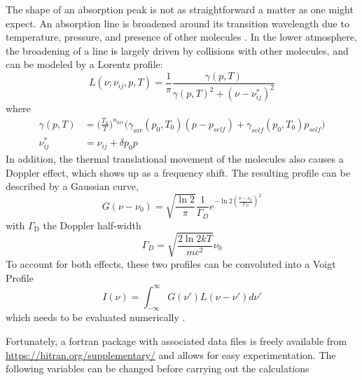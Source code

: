 \documentclass[10pt,a4paper,titlepage]{article}
\begin{document}
The shape of an absorption peak is not as straightforward a matter as
one might expect. An absorption line is broadened around its
transition wavelength due to temperature, pressure, and presence of
other molecules \citep{tennyson-al14:IUPAC}. In the lower atmosphere,
the broadening of a line is largely driven by collisions with other
molecules, and can be modeled by a Lorentz profile:
\begin{equation}
L(\nu; \nu_{ij}, p, T) = \frac{1}{\pi} \frac{\gamma(p, T)}{\gamma(p, T)^2 + (\nu - \nu^*_{ij})^2}
\end{equation}
where
\begin{equation}
\begin{split}
\gamma(p, T) & = \Bigg( \frac{T_0}{T} \Bigg)^{n_{air}} \bigg( \gamma_{air}(p_0, T_0)(p - p_{self}) + \gamma_{self}(p_0, T_0) p_{self} \bigg) \\
\nu_{ij}^* & = \nu_{ij} + \delta p_0 p
\end{split}
\end{equation}
In addition, the thermal translational movement of the molecules also
causes a Doppler effect, which shows up as a frequency shift. The
resulting profile can be described by a Gaussian curve, 
\begin{equation}
G(\nu - \nu_0) = \sqrt{\frac{\ln 2}{\pi}} \frac{1}{\Gamma_D} e^{-\ln 2 (\frac{\nu - \nu_0}{\Gamma_D})^2}
\end{equation}
with $\Gamma$$_{\text{D}}$ the Doppler half-width
\begin{equation}
\Gamma_D = \sqrt{\frac{2 \ln 2 k T}{m c^2}} \nu_0
\end{equation}
To account for both effects, these two profiles can be convoluted into
a Voigt Profile
\begin{equation}
I(\nu) = \int^{\infty}_{-\infty} G(\nu') L(\nu - \nu') d\nu'
\end{equation}
which needs to be evaluated numerically \citep{thompson93:voigt}.

Fortunately, a fortran package with associated data files
\citep{gordon-al22:hitran2020,lamouroux-al15:linemixing} is freely
available from \url{https://hitran.org/supplementary/} and allows for easy
experimentation.  The following variables can be changed before
carrying out the calculations
\end{document}
